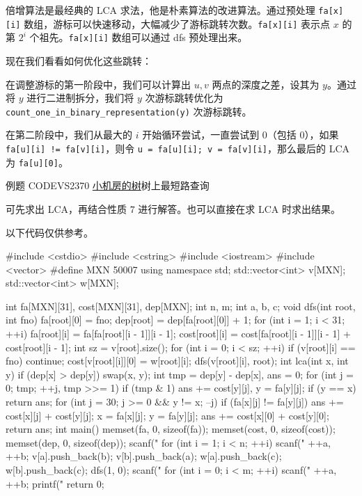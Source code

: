倍增算法是最经典的 LCA 求法，他是朴素算法的改进算法。通过预处理 \texttt{fa[x][i]} 数组，游标可以快速移动，大幅减少了游标跳转次数。\texttt{fa[x][i]} 表示点 $x$ 的第 $2^i$ 个祖先。\texttt{fa[x][i]} 数组可以通过 dfs 预处理出来。

现在我们看看如何优化这些跳转：  

在调整游标的第一阶段中，我们可以计算出 $u,v$ 两点的深度之差，设其为 $y$。通过将 $y$ 进行二进制拆分，我们将 $y$ 次游标跳转优化为 \texttt{count_one_in_binary_representation(y)} 次游标跳转。  

在第二阶段中，我们从最大的 $i$ 开始循环尝试，一直尝试到 $0$（包括 $0$），如果 \texttt{fa[u][i] != fa[v][i]}，则令 \texttt{u = fa[u][i]; v = fa[v][i]}，那么最后的 LCA 为 \texttt{fa[u][0]}。

\begin{NOTE}{例题}{}
CODEVS2370 \href{http://codevs.cn/problem/2370/}{小机房的树}树上最短路查询
\end{NOTE}


可先求出 LCA，再结合性质 $7$ 进行解答。也可以直接在求 LCA 时求出结果。  

以下代码仅供参考。

\begin{cppcode}
#include <cstdio>
#include <cstring>
#include <iostream>
#include <vector>
#define MXN 50007
using namespace std;
std::vector<int> v[MXN];
std::vector<int> w[MXN];

int fa[MXN][31], cost[MXN][31], dep[MXN];
int n, m;
int a, b, c;
void dfs(int root, int fno) {
  fa[root][0] = fno;
  dep[root] = dep[fa[root][0]] + 1;
  for (int i = 1; i < 31; ++i) {
    fa[root][i] = fa[fa[root][i - 1]][i - 1];
    cost[root][i] = cost[fa[root][i - 1]][i - 1] + cost[root][i - 1];
  }
  int sz = v[root].size();
  for (int i = 0; i < sz; ++i) {
    if (v[root][i] == fno) continue;
    cost[v[root][i]][0] = w[root][i];
    dfs(v[root][i], root);
  }
}
int lca(int x, int y) {
  if (dep[x] > dep[y]) swap(x, y);
  int tmp = dep[y] - dep[x], ans = 0;
  for (int j = 0; tmp; ++j, tmp >>= 1)
    if (tmp & 1) ans += cost[y][j], y = fa[y][j];
  if (y == x) return ans;
  for (int j = 30; j >= 0 && y != x; --j) {
    if (fa[x][j] != fa[y][j]) {
      ans += cost[x][j] + cost[y][j];
      x = fa[x][j];
      y = fa[y][j];
    }
  }
  ans += cost[x][0] + cost[y][0];
  return ans;
}
int main() {
  memset(fa, 0, sizeof(fa));
  memset(cost, 0, sizeof(cost));
  memset(dep, 0, sizeof(dep));
  scanf("%
  for (int i = 1; i < n; ++i) {
    scanf("%
    ++a, ++b;
    v[a].push_back(b);
    v[b].push_back(a);
    w[a].push_back(c);
    w[b].push_back(c);
  }
  dfs(1, 0);
  scanf("%
  for (int i = 0; i < m; ++i) {
    scanf("%
    ++a, ++b;
    printf("%
  }
  return 0;
}
\end{cppcode}

